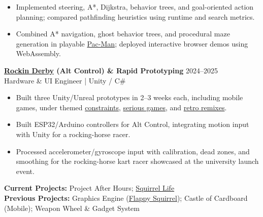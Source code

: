 \documentclass[10pt,letterpaper]{extarticle}
\begin{document}
\begin{itemize}
\item Implemented steering, A*, Dijkstra, behavior trees, and goal-oriented action planning; compared pathfinding heuristics using runtime and search metrics.
\item Combined A* navigation, ghost behavior trees, and procedural maze generation in playable \href{https://nrhart.github.io/NoahsPortfolio/projects/ai.html\#pac-man}{Pac-Man}; deployed interactive browser demos using WebAssembly.
\end{itemize}
\vspace{2.15pt}
\textbf{\href{https://nrhart.github.io/NoahsPortfolio/projects/unity.html\#rockin-derby}{Rockin Derby} (Alt Control) \& Rapid Prototyping} \hfill 2024--2025\\[-2pt]
Hardware \& UI Engineer | Unity / C\#
\begin{itemize}
\item Built three Unity/Unreal prototypes in 2--3 weeks each, including mobile games, under themed \href{https://nrhart.github.io/NoahsPortfolio/projects/unreal.html\#castle-of-cardboard}{constraints}, \href{https://nrhart.github.io/NoahsPortfolio/projects/unity.html\#pop-city}{serious games}, and \href{https://nrhart.github.io/NoahsPortfolio/projects/unity.html\#jurassic-jump}{retro remixes}.
\item Built ESP32/Arduino controllers for Alt Control, integrating motion input with Unity for a rocking-horse racer.
\item Processed accelerometer/gyroscope input with calibration, dead zones, and smoothing for the rocking-horse kart racer showcased at the university launch event.
\end{itemize}

\vspace{2.15pt}
\textbf{Current Projects:} Project After Hours; \href{https://nrhart.github.io/NoahsPortfolio/projects/unreal.html\#current-project}{Squirrel Life}\\
\textbf{Previous Projects:} Graphics Engine (\href{https://nrhart.github.io/NoahsPortfolio/projects/custom-engine.html\#graphics-engine}{Flappy Squirrel}); Castle of Cardboard (Mobile); Weapon Wheel \& Gadget System
\end{document}
